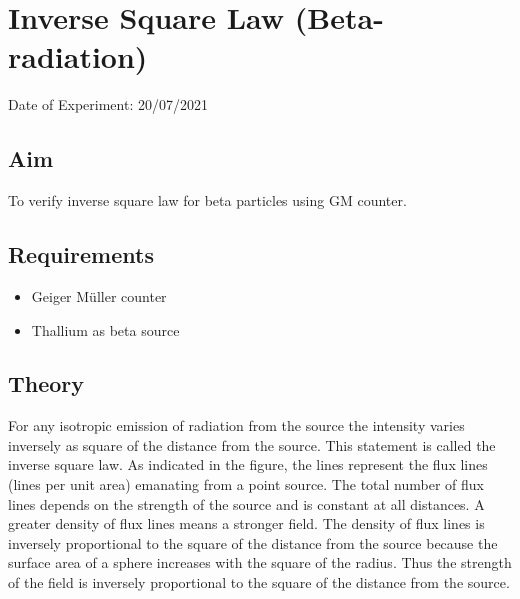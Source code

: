 
	
	
	\chapter{Inverse Square Law (Beta-radiation)}
	\vspace{-1cm}
	
	\begin{center}%
		Date of Experiment: 20/07/2021
	\end{center}
	\section{Aim}
	To verify inverse square law for beta particles using GM counter.
	
	\section{Requirements}
	\begin{itemize}
		\item 	Geiger M{\"u}ller counter
		\item 	Thallium as beta source
	\end{itemize}

\section{Theory}
For any isotropic emission of radiation from the source the intensity varies inversely as square of the distance from the source. This statement is called the inverse square law. As indicated in the figure, the lines represent the flux lines (lines per unit area) emanating from a point source. The total number of flux lines depends on the strength of the source and is constant at all distances. A greater density of flux lines means a stronger field. The density of flux lines is inversely proportional to the square of the distance from the source because the surface area of a sphere increases with the square of the radius. Thus the strength of the field is inversely proportional to the square of the distance from the source.

